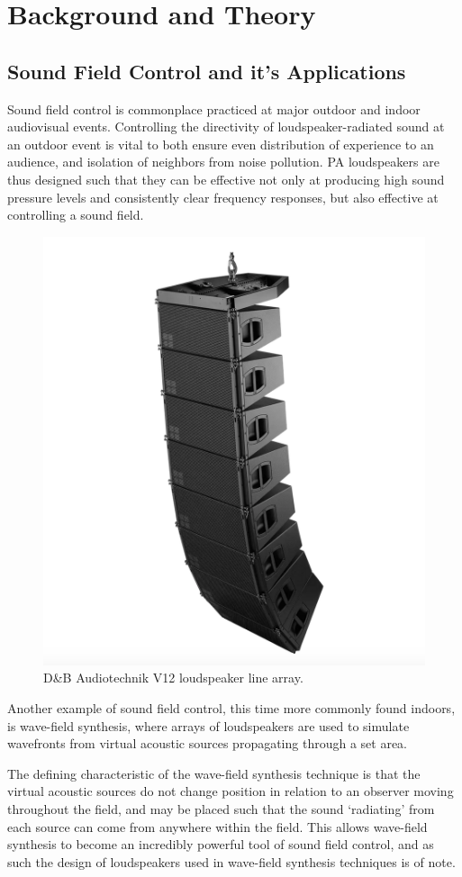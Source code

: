 \documentclass{report}
\begin{document}
\chapter{Background and Theory}
    \section{Sound Field Control and it's Applications}
        Sound field control is commonplace practiced at major outdoor and indoor audiovisual events.
        Controlling the directivity of loudspeaker-radiated sound at an outdoor event is vital to both ensure even distribution of experience to an audience, and isolation of neighbors from noise pollution.
        PA loudspeakers are thus designed such that they can be effective not only at producing high sound pressure levels and consistently clear frequency responses, but also effective at controlling a sound field.

        \begin{figure}[H]
            \centering
            \includegraphics[width = 0.4\linewidth]{figs/dbAudiotechnik.png}
            \caption{D\&B Audiotechnik V12 loudspeaker line array.}
            \label{dbAudiotechnik}
        \end{figure}

        Another example of sound field control, this time more commonly found indoors, is wave-field synthesis, where arrays of loudspeakers are used to simulate wavefronts from virtual acoustic sources propagating through a set area.

        The defining characteristic of the wave-field synthesis technique is that the virtual acoustic sources do not change position in relation to an observer moving throughout the field, and may be placed such that the sound `radiating' from each source can come from anywhere within the field.
        This allows wave-field synthesis to become an incredibly powerful tool of sound field control, and as such the design of loudspeakers used in wave-field synthesis techniques is of note.
\end{document}
